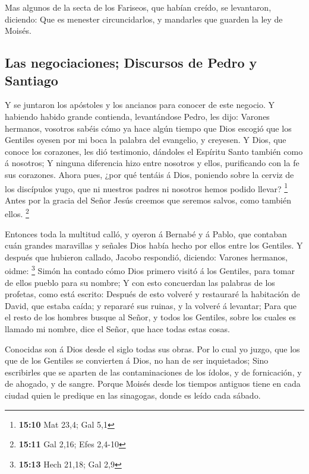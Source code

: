  Mas algunos de la secta de los Fariseos, que habían creído,
se levantaron, diciendo: Que es menester circuncidarlos, y mandarles que
guarden la ley de Moisés.

\hypertarget{las-negociaciones-discursos-de-pedro-y-santiago}{%
\subsection{Las negociaciones; Discursos de Pedro y
Santiago}\label{las-negociaciones-discursos-de-pedro-y-santiago}}

 Y se juntaron los apóstoles y los ancianos para conocer de
este negocio.  Y habiendo habido grande contienda,
levantándose Pedro, les dijo: Varones hermanos, vosotros sabéis cómo ya
hace algún tiempo que Dios escogió que los Gentiles oyesen por mi boca
la palabra del evangelio, y creyesen.  Y Dios, que conoce
los corazones, les dió testimonio, dándoles el Espíritu Santo también
como á nosotros;  Y ninguna diferencia hizo entre nosotros y
ellos, purificando con la fe sus corazones.  Ahora pues,
¿por qué tentáis á Dios, poniendo sobre la cerviz de los discípulos
yugo, que ni nuestros padres ni nosotros hemos podido llevar?
\footnote{\textbf{15:10} Mat 23,4; Gal 5,1}  Antes por la
gracia del Señor Jesús creemos que seremos salvos, como también ellos.
\footnote{\textbf{15:11} Gal 2,16; Efes 2,4-10}

 Entonces toda la multitud calló, y oyeron á Bernabé y á
Pablo, que contaban cuán grandes maravillas y señales Dios había hecho
por ellos entre los Gentiles.  Y después que hubieron
callado, Jacobo respondió, diciendo: Varones hermanos, oidme:
\footnote{\textbf{15:13} Hech 21,18; Gal 2,9}  Simón ha
contado cómo Dios primero visitó á los Gentiles, para tomar de ellos
pueblo para su nombre;  Y con esto concuerdan las palabras
de los profetas, como está escrito:  Después de esto
volveré y restauraré la habitación de David, que estaba caída; y
repararé sus ruinas, y la volveré á levantar;  Para que el
resto de los hombres busque al Señor, y todos los Gentiles, sobre los
cuales es llamado mi nombre, dice el Señor, que hace todas estas cosas.

 Conocidas son á Dios desde el siglo todas sus obras.
 Por lo cual yo juzgo, que los que de los Gentiles se
convierten á Dios, no han de ser inquietados;  Sino
escribirles que se aparten de las contaminaciones de los ídolos, y de
fornicación, y de ahogado, y de sangre.  Porque Moisés
desde los tiempos antiguos tiene en cada ciudad quien le predique en las
sinagogas, donde es leído cada sábado.

